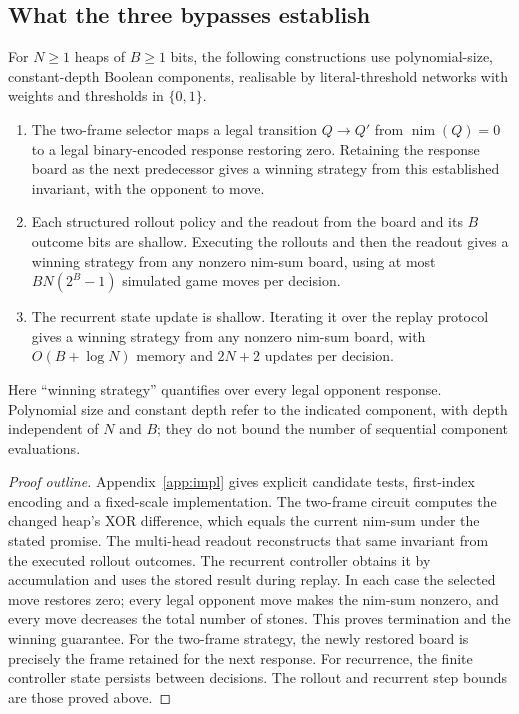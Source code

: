 \documentclass[twoside,11pt]{article}
\numberwithin{theorem}{section}
\numberwithin{equation}{section}
\begin{document}
\subsection{What the three bypasses establish}
\label{sec:bypass-scope}

\begin{proposition}
\label{prop:bypass-interfaces}
For $N\ge1$ heaps of $B\ge1$ bits, the following constructions use polynomial-size, constant-depth Boolean components, realisable by literal-threshold networks with weights and thresholds in $\{0,1\}$.
\begin{enumerate}[leftmargin=*,label=(\roman*)]
\item The two-frame selector maps a legal transition $Q\to Q'$ from $\operatorname{nim}(Q)=0$ to a legal binary-encoded response restoring zero. Retaining the response board as the next predecessor gives a winning strategy from this established invariant, with the opponent to move.
\item Each structured rollout policy and the readout from the board and its $B$ outcome bits are shallow. Executing the rollouts and then the readout gives a winning strategy from any nonzero nim-sum board, using at most $BN(2^B-1)$ simulated game moves per decision.
\item The recurrent state update is shallow. Iterating it over the replay protocol gives a winning strategy from any nonzero nim-sum board, with $O(B+\log N)$ memory and $2N+2$ updates per decision.
\end{enumerate}
Here ``winning strategy'' quantifies over every legal opponent response. Polynomial size and constant depth refer to the indicated component, with depth independent of $N$ and $B$; they do not bound the number of sequential component evaluations.
\end{proposition}

\begin{proof}[Proof outline]
Appendix~\ref{app:impl} gives explicit candidate tests, first-index encoding and a fixed-scale implementation. The two-frame circuit computes the changed heap's XOR difference, which equals the current nim-sum under the stated promise. The multi-head readout reconstructs that same invariant from the executed rollout outcomes. The recurrent controller obtains it by accumulation and uses the stored result during replay. In each case the selected move restores zero; every legal opponent move makes the nim-sum nonzero, and every move decreases the total number of stones. This proves termination and the winning guarantee. For the two-frame strategy, the newly restored board is precisely the frame retained for the next response. For recurrence, the finite controller state persists between decisions. The rollout and recurrent step bounds are those proved above.
\end{proof}
\end{document}
